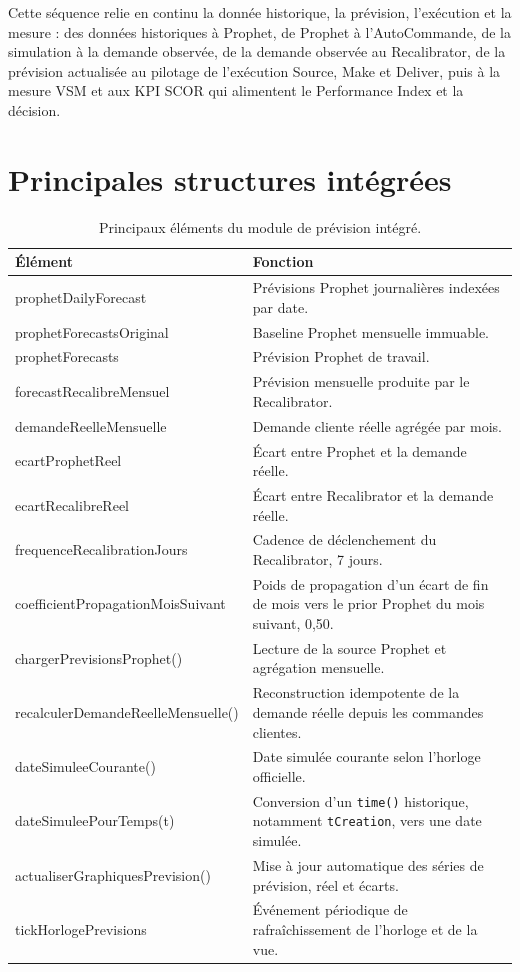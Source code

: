\documentclass[11pt,a4paper]{article}
\newcommand{\code}[1]{\texttt{#1}}
\begin{document}
Cette séquence relie en continu la donnée historique, la prévision, l'exécution et la mesure : des données historiques à Prophet, de Prophet à l'AutoCommande, de la simulation à la demande observée, de la demande observée au Recalibrator, de la prévision actualisée au pilotage de l'exécution Source, Make et Deliver, puis à la mesure VSM et aux KPI SCOR qui alimentent le Performance Index et la décision.

\section{Principales structures intégrées}

\begin{table}[htbp]
\centering
\small
\begin{tabularx}{\textwidth}{>{\ttfamily}p{4.2cm} X}
\toprule
Élément & Fonction \\
\midrule
prophet\allowbreak DailyForecast & Prévisions Prophet journalières indexées par date. \\
prophet\allowbreak Forecasts\allowbreak Original & Baseline Prophet mensuelle immuable. \\
prophetForecasts & Prévision Prophet de travail. \\
forecast\allowbreak Recalibre\allowbreak Mensuel & Prévision mensuelle produite par le Recalibrator. \\
demande\allowbreak Reelle\allowbreak Mensuelle & Demande cliente réelle agrégée par mois. \\
ecart\allowbreak ProphetReel & Écart entre Prophet et la demande réelle. \\
ecart\allowbreak RecalibreReel & Écart entre Recalibrator et la demande réelle. \\
frequence\allowbreak Recalibration\allowbreak Jours & Cadence de déclenchement du Recalibrator, 7 jours. \\
coefficient\allowbreak Propagation\allowbreak Mois\allowbreak Suivant & Poids de propagation d'un écart de fin de mois vers le prior Prophet du mois suivant, 0,50. \\
charger\allowbreak Previsions\allowbreak Prophet() & Lecture de la source Prophet et agrégation mensuelle. \\
recalculer\allowbreak Demande\allowbreak Reelle\allowbreak Mensuelle() & Reconstruction idempotente de la demande réelle depuis les commandes clientes. \\
date\allowbreak SimuleeCourante() & Date simulée courante selon l'horloge officielle. \\
date\allowbreak SimuleePourTemps(t) & Conversion d'un \code{time()} historique, notamment \code{tCreation}, vers une date simulée. \\
actualiser\allowbreak Graphiques\allowbreak Prevision() & Mise à jour automatique des séries de prévision, réel et écarts. \\
tick\allowbreak Horloge\allowbreak Previsions & Événement périodique de rafraîchissement de l'horloge et de la vue. \\
\bottomrule
\end{tabularx}
\caption{Principaux éléments du module de prévision intégré.}
\end{table}
\end{document}
